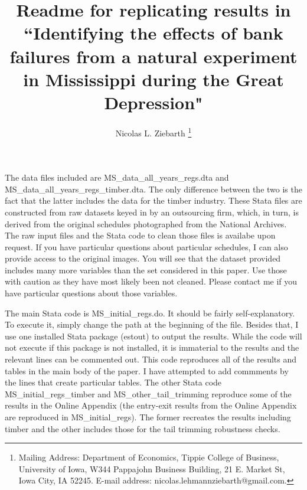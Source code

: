 \documentclass[11pt]{article}
\author{Nicolas L. Ziebarth \thanks{Mailing Address: Department of Economics, Tippie College of Business,  University of Iowa, W344 Pappajohn Business Building, 21 E. Market St, Iowa City, IA 52245. E-mail address: nicolas.lehmannziebarth@gmail.com. }}
\title{Readme for replicating results in ``Identifying the effects of bank failures from a natural experiment in Mississippi during the 
Great Depression"}
\begin{document}
\maketitle

The data files included are MS\_data\_all\_years\_regs.dta and MS\_data\_all\_years\_regs\_timber.dta. The only difference between the two is the fact that the latter includes the data for the timber industry. These Stata files are constructed from raw datasets keyed in by an outsourcing firm, which, in turn, is derived from the original schedules photographed from the National Archives. The raw input files and the Stata code to clean those files is availabe upon request. If you have particular questions about particular schedules, I can also provide access to the original images. You will see that the dataset provided includes many more variables than the set considered in this paper. Use those with caution as they have most likely been not cleaned. Please contact me if you have particular questions about those variables.

The main Stata code is MS\_initial\_regs.do. It should be fairly self-explanatory. To execute it, simply change the path at the beginning of the file. Besides that, I use one installed Stata package (estout) to output the results. While the code will not execute if this package is not installed, it is immaterial to the results and the relevant lines can be commented out. This code reproduces all of the results and tables in the main body of the paper. I have attempted to add commments by the lines that create particular tables. The other Stata code MS\_initial\_regs\_timber and MS\_other\_tail\_trimming reproduce some of the results in the Online Appendix (the entry-exit results from the Online Appendix are reproduced in MS\_initial\_regs). The former recreates the results including timber and the other includes those for the tail trimming robustness checks.
\end{document}
